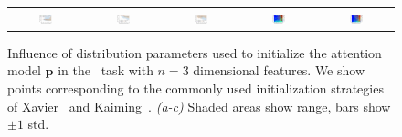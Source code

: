 \begin{figure}[htpb]
	\vspace{-1pt}
	\setlength{\tabcolsep}{0pt}
	\begin{tabular}{ccccc}
		{\includegraphics[width=0.2\textwidth, align=c, trim={0cm 0cm 0cm 0cm}, clip]{init/unsup_colors3.pdf}} &
		{\includegraphics[width=0.2\textwidth, align=c, trim={0cm 0cm 0cm 0cm}, clip]{init/sup_colors3.pdf}} &
		{\includegraphics[width=0.2\textwidth, align=c, trim={0cm 0cm 0cm 0cm}, clip]{init/wsup_colors3.pdf}} &
		{\includegraphics[width=0.2\textwidth, align=c, trim={0cm 0cm 0cm 0cm}, clip]{init/acc_scale_cos_colors3.pdf}} &
		{\includegraphics[width=0.2\textwidth, align=c, trim={0cm 0cm 0cm 0cm}, clip]{init/acc_scale_cos_colors3_gcn.pdf}}
	\end{tabular}
	\caption{\small Influence of distribution parameters used to initialize the attention model $\mathbf{p}$ in the ~task with $n=3$ dimensional features. We show points corresponding to the commonly used initialization strategies of \ul{Xavier}~\citep{he2015delving} and \ul{Kaiming}~\citep{he2015delving}. \textit{(a-c)} Shaded areas show range, bars show $\pm1$ std.}
	\label{fig:init}
	\vspace{-10pt}
\end{figure}

